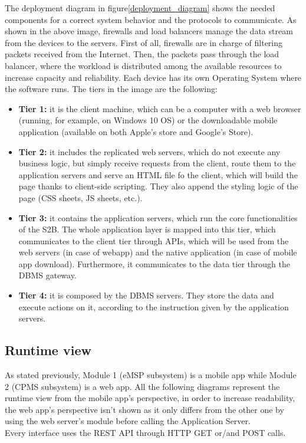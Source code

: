 The deployment diagram in figure\ref{deployment_diagram} shows the needed components for a correct system behavior and the protocols to communicate. As shown in the above image, firewalls and load balancers manage the data stream
from the devices to the servers. First of all, firewalls are in charge of filtering packets
received from the Internet. Then, the packets pass through the load balancer, where
the workload is distributed among the available resources to increase capacity and
reliability.
Each device has its own Operating System where the software runs.
The tiers in the image are the following:
\begin{itemize}
    \item \textbf{Tier 1:} it is the client machine, which can be a computer with a web browser (running, for example, on Windows 10 OS) or the downloadable mobile application (available on both Apple's store and Google's Store).
    \item \textbf{Tier 2:} it includes the replicated web servers, which do not execute any business logic, but simply receive requests from the client, route them to the application servers and serve an HTML file fo the client, which will build the page thanks to client-side scripting. They also append the styling logic of the page (CSS sheets, JS sheets, etc.).
    \item \textbf{Tier 3:} it contains the application servers, which run the core functionalities of the S2B. The whole application layer is mapped into this tier, which communicates to the client tier through APIs, which will be used from the web servers (in case of webapp) and the native application (in case of mobile app download). Furthermore, it communicates to the data tier through the DBMS gateway.
    \item \textbf{Tier 4:} it is composed by the DBMS servers. They store the data and execute actions on it, according to the instruction given by the application servers.
\end{itemize}
\subsection{Runtime view}
As stated previously, Module 1 (eMSP subsystem) is a mobile app while Module 2 (CPMS subsystem) is a web app. All the following diagrams represent the runtime view from the mobile app’s perspective, in order to increase readability, the web app’s perspective isn’t shown as it only differs from the other one by using the web server’s module before calling the Application Server.\\
Every interface uses the REST API through HTTP GET or/and POST calls.
